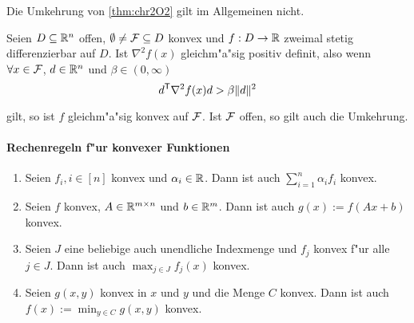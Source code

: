 %
\begin{Bemerkung}
	Die Umkehrung von \ref{thm:chr2O2} gilt im Allgemeinen nicht.
\end{Bemerkung}
%
\begin{Satz}
\label{thm:chr2O3}
	Seien $D\subseteq\mathbb R^n$ offen, $\emptyset\neq\mathcal{F}\subseteq D$ konvex und $f:D\to\mathbb R$ zweimal stetig differenzierbar auf $D$.
	Ist $\nabla^2 f(x)$ gleichm"a"sig positiv definit, also wenn $\forall x \in \mathcal{F}$, $d\in\mathbb R^n$ und $\beta\in(0,\infty)$
	\begin{equation}
		d^\mathsf{T}\nabla^2 f(x)d > \beta \Vert d\Vert^2
	\end{equation}

	\noindent
	gilt, so ist $f$ gleichm"a"sig konvex auf $\mathcal{F}$. Ist $\mathcal{F}$ offen, so gilt auch die Umkehrung.
\end{Satz}
%
\paragraph{Rechenregeln f"ur konvexer Funktionen}


\begin{enumerate}[label=\emph{\alph*})]
	\item Seien $f_i, i\in[n]$ konvex und $\alpha_i\in\mathbb R$.
		  Dann ist auch $\sum_{i=1}^n\alpha_if_i$ konvex.
	\item Seien $f$ konvex, $A\in\mathbb R^{m\times n}$ und $b\in\mathbb R^m$.
		  Dann ist auch $g(x):=f(Ax+b)$ konvex.
	\item Seien $J$ eine beliebige auch unendliche Indexmenge und $f_j$ konvex f"ur alle $j\in J$.
		  Dann ist auch $\max_{j\in J}f_j(x)$ konvex.
	\item Seien $g(x,y)$ konvex in $x$ und $y$ und die Menge $C$ konvex.
		  Dann ist auch $f(x) := \min_{y\in C}g(x,y)$ konvex.
\end{enumerate}